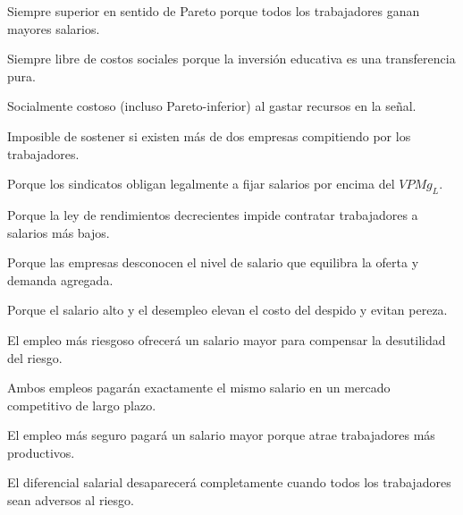 \begin{opts}
    \item Siempre superior en sentido de Pareto porque todos los trabajadores ganan mayores salarios.
    \item Siempre libre de costos sociales porque la inversión educativa es una transferencia pura.
    \item Socialmente costoso (incluso Pareto-inferior) al gastar recursos en la señal.
    \item Imposible de sostener si existen más de dos empresas compitiendo por los trabajadores.
\end{opts}

\begin{opts}
    \item Porque los sindicatos obligan legalmente a fijar salarios por encima del $VPMg_L$.
    \item Porque la ley de rendimientos decrecientes impide contratar trabajadores a salarios más bajos.
    \item Porque las empresas desconocen el nivel de salario que equilibra la oferta y demanda agregada.
    \item Porque el salario alto y el desempleo elevan el costo del despido y evitan pereza.
\end{opts}

\begin{opts}
    \item El empleo más riesgoso ofrecerá un salario mayor para compensar la desutilidad del riesgo.
    \item Ambos empleos pagarán exactamente el mismo salario en un mercado competitivo de largo plazo.
    \item El empleo más seguro pagará un salario mayor porque atrae trabajadores más productivos.
    \item El diferencial salarial desaparecerá completamente cuando todos los trabajadores sean adversos al riesgo.
\end{opts}

